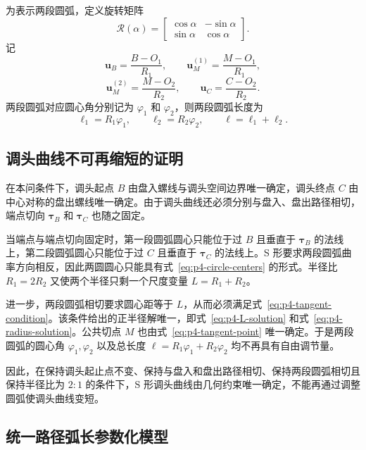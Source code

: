 为表示两段圆弧，定义旋转矩阵
\begin{equation}
    \mathcal R(\alpha)=
    \begin{bmatrix}
        \cos\alpha & -\sin\alpha\\
        \sin\alpha & \cos\alpha
    \end{bmatrix}.
    \label{eq:p4-rotation}
\end{equation}
记
\begin{equation}
    \bm u_B=\frac{B-O_1}{R_1},\qquad
    \bm u_M^{(1)}=\frac{M-O_1}{R_1},
    \label{eq:p4-u1}
\end{equation}
\begin{equation}
    \bm u_M^{(2)}=\frac{M-O_2}{R_2},\qquad
    \bm u_C=\frac{C-O_2}{R_2}.
    \label{eq:p4-u2}
\end{equation}
两段圆弧对应圆心角分别记为 $\varphi_1$ 和 $\varphi_2$，则两段圆弧长度为
\begin{equation}
    \ell_1=R_1\varphi_1,\qquad
    \ell_2=R_2\varphi_2,\qquad
    \ell=\ell_1+\ell_2.
    \label{eq:p4-arc-lengths}
\end{equation}

\subsection{调头曲线不可再缩短的证明}

在本问条件下，调头起点 $B$ 由盘入螺线与调头空间边界唯一确定，调头终点 $C$ 由中心对称的盘出螺线唯一确定。由于调头曲线还必须分别与盘入、盘出路径相切，端点切向 $\bm\tau_B$ 和 $\bm\tau_C$ 也随之固定。

当端点与端点切向固定时，第一段圆弧圆心只能位于过 $B$ 且垂直于 $\bm\tau_B$ 的法线上，第二段圆弧圆心只能位于过 $C$ 且垂直于 $\bm\tau_C$ 的法线上。S 形要求两段圆弧曲率方向相反，因此两圆圆心只能具有式~\eqref{eq:p4-circle-centers} 的形式。半径比 $R_1=2R_2$ 又使两个半径只剩一个尺度变量 $L=R_1+R_2$。

进一步，两段圆弧相切要求圆心距等于 $L$，从而必须满足式~\eqref{eq:p4-tangent-condition}。该条件给出的正半径解唯一，即式~\eqref{eq:p4-L-solution} 和式~\eqref{eq:p4-radius-solution}。公共切点 $M$ 也由式~\eqref{eq:p4-tangent-point} 唯一确定。于是两段圆弧的圆心角 $\varphi_1,\varphi_2$ 以及总长度 $\ell=R_1\varphi_1+R_2\varphi_2$ 均不再具有自由调节量。

因此，在保持调头起止点不变、保持与盘入和盘出路径相切、保持两段圆弧相切且保持半径比为 $2:1$ 的条件下，S 形调头曲线由几何约束唯一确定，不能再通过调整圆弧使调头曲线变短。

\subsection{统一路径弧长参数化模型}

